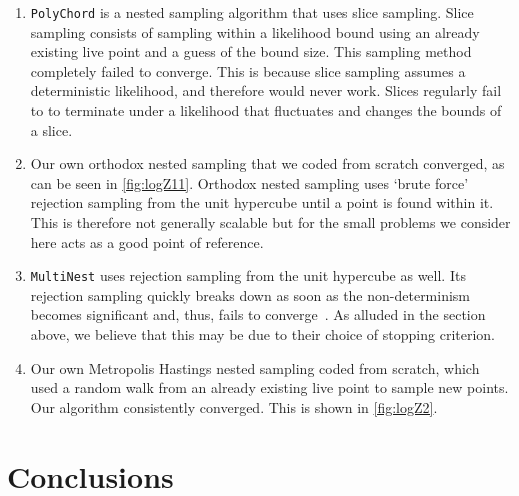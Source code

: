 \begin{enumerate}
    \item \texttt{PolyChord} is a nested sampling algorithm that uses slice sampling. Slice sampling consists of sampling within a likelihood bound using an already existing live point and a guess of the bound size. This sampling method completely failed to converge. \cite{Handley_2015} This is because slice sampling assumes a deterministic likelihood, and therefore would never work. Slices regularly fail to to terminate under a likelihood that fluctuates and changes the bounds of a slice.

     \item Our own orthodox nested sampling that we coded from scratch converged, as can be seen in \cref{fig:logZ11}. Orthodox nested sampling uses `brute force' rejection sampling from the unit hypercube until a point is found within it. This is therefore not generally scalable but for the small problems we consider here acts as a good point of reference. 
    \item \texttt{MultiNest} uses rejection sampling from the unit hypercube as well. Its rejection sampling quickly breaks down as soon as the non-determinism becomes significant and, thus, fails to converge~\cite{Feroz_2009}. As alluded in the section above, we believe that this may be due to their choice of stopping criterion.
   
    \item Our own Metropolis Hastings nested sampling coded from scratch, which used a random walk from an already existing live point to sample new points. Our algorithm consistently converged. This is shown in \cref{fig:logZ2}. \cite{doi:10.1080/00031305.1995.10476177}
\end{enumerate}

\section{Conclusions}


